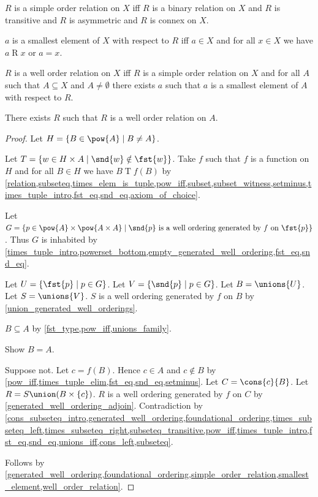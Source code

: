 \begin{definition}\label{simple_order_relation}
    $R$ is a simple order relation on $X$ iff
    $R$ is a binary relation on $X$ and
    $R$ is transitive and
    $R$ is asymmetric and
    $R$ is connex on $X$.
\end{definition}

\begin{definition}\label{smallest_element}
    $a$ is a smallest element of $X$ with respect to $R$ iff
    $a\in X$ and for all $x\in X$ we have $a\mathrel{R}x$ or $a = x$.
\end{definition}

\begin{definition}\label{well_order_relation}
    $R$ is a well order relation on $X$ iff
        $R$ is a simple order relation on $X$ and
        for all $A$ such that $A\subseteq X$ and $A\neq\emptyset$
            there exists $a$ such that $a$ is a smallest element of $A$ with respect to $R$.
\end{definition}

\begin{theorem}\label{well_ordering_theorem}
    There exists $R$ such that $R$ is a well order relation on $A$.
\end{theorem}
\begin{proof}
    Let $H=\{B\in\pow{A}\mid B\neq A\}$.

    Let $T=\{w\in H\times A\mid \snd{w}\notin\fst{w}\}$.
    Take $f$ such that $f$ is a function on $H$ and for all $B\in H$ we have $B\mathrel{T}f(B)$
        by \cref{relation,subseteq,times_elem_is_tuple,pow_iff,subset,subset_witness,setminus,times_tuple_intro,fst_eq,snd_eq,axiom_of_choice}.

    Let $G=\{p\in\pow{A}\times\pow{A\times A}\mid
        \text{$\snd{p}$ is a well ordering generated by $f$ on $\fst{p}$}\}$.
    Thus $G$ is inhabited
        by \cref{times_tuple_intro,powerset_bottom,empty_generated_well_ordering,fst_eq,snd_eq}.

    Let $U=\{\fst{p}\mid p\in G\}$.
    Let $V=\{\snd{p}\mid p\in G\}$.
    Let $B=\unions{U}$.
    Let $S=\unions{V}$.
    $S$ is a well ordering generated by $f$ on $B$ by \cref{union_generated_well_orderings}.

    $B\subseteq A$ by \cref{fst_type,pow_iff,unions_family}.

    Show $B=A$.
    \begin{subproof}
        Suppose not.
        Let $c=f(B)$.
        Hence $c\in A$ and $c\notin B$
            by \cref{pow_iff,times_tuple_elim,fst_eq,snd_eq,setminus}.
        Let $C=\cons{c}{B}$.
        Let $R=S\union(B\times\{c\})$.
        $R$ is a well ordering generated by $f$ on $C$
            by \cref{generated_well_ordering_adjoin}.
        Contradiction
            by \cref{cons_subseteq_intro,generated_well_ordering,foundational_ordering,times_subseteq_left,times_subseteq_right,subseteq_transitive,pow_iff,times_tuple_intro,fst_eq,snd_eq,unions_iff,cons_left,subseteq}.
    \end{subproof}

    Follows by \cref{generated_well_ordering,foundational_ordering,simple_order_relation,smallest_element,well_order_relation}.
\end{proof}
